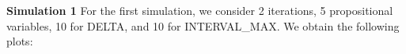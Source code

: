 \documentclass[runningheads]{llncs}
\begin{document}
\noindent\textbf{Simulation 1}
For the first simulation, we consider 2 iterations, 5 propositional variables, 10 for DELTA, and 10 for INTERVAL\_MAX. We obtain the following plots:

\end{document}
